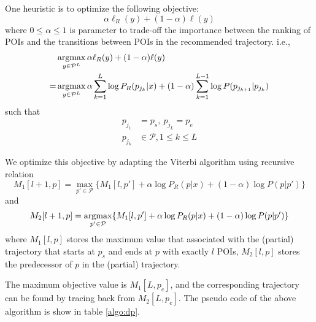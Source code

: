 One heuristic is to optimize the following objective:
\begin{displaymath}
    \alpha \ell_R(y) + (1-\alpha) \ell(y)
\end{displaymath}
where $0 \le \alpha \le 1$ is parameter to trade-off the importance between the ranking of POIs
and the transitions between POIs in the recommended trajectory.
i.e.,
\begin{align*}
    & \operatorname*{argmax}_{y \in \mathcal{P}^L} \alpha \ell_R(y) + (1-\alpha) \ell(y) \\
   =& \operatorname*{argmax}_{y \in \mathcal{P}^L} \alpha \sum_{k=1}^{L} \log P_R(p_{j_k} | x) +
                                    (1-\alpha) \sum_{k=1}^{L-1} \log P(p_{j_{k+1}} | p_{j_k})
\end{align*}
such that
\begin{align*}
    p_{j_1} &= p_s, ~ p_{j_L} = p_e \\
    p_{j_k} &\in \mathcal{P}, 1 \le k \le L
\end{align*}

We optimize this objective by adapting the Viterbi algorithm using recursive relation
\begin{equation}
    \label{eq:max}
    M_1[l+1, p] = \max_{p' \in \mathcal{P}} \{ M_1[l, p'] + \alpha \log P_R(p|x) + (1-\alpha) \log P(p|p') \}
\end{equation}
and
\begin{equation}
    \label{eq:argmax}
    M_2[l+1, p] = \operatorname*{argmax}_{p' \in \mathcal{P}} \{ M_1[l, p'] + \alpha \log P_R(p|x) + (1-\alpha) \log P(p|p') \}
\end{equation}
where $M_1[l, p]$ stores the maximum value that associated with the (partial) trajectory
that starts at $p_s$ and ends at $p$ with exactly $l$ POIs,
$M_2[l, p]$ stores the predecessor of $p$ in the (partial) trajectory.

The maximum objective value is $M_1[L, p_e]$,
and the corresponding trajectory can be found by tracing back from $M_2[L, p_e]$.
The pseudo code of the above algorithm is show in table \ref{algo:dp}.


